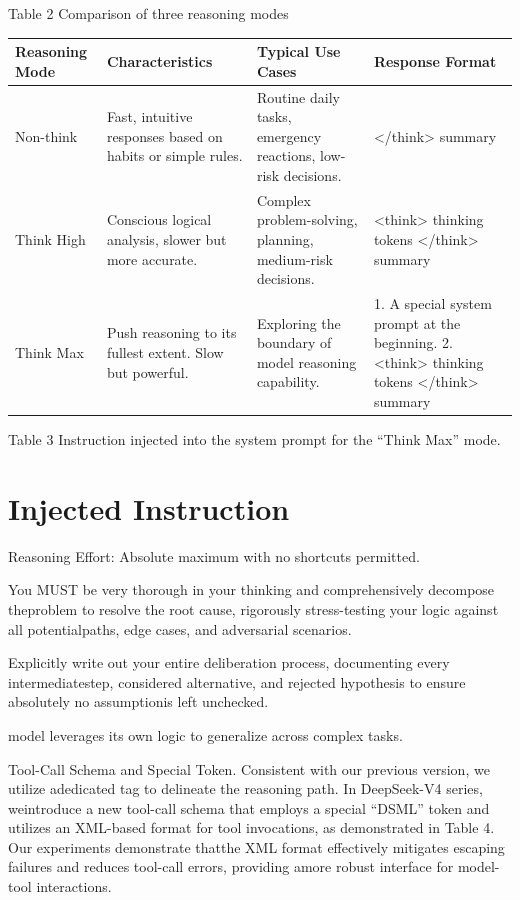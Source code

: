 \documentclass[
  10
]{article}
\newcounter{none} %
\begin{document}
Table 2 \textbar{} Comparison of three reasoning modes

{\def\LTcaptype{none} %
\begin{longtable}[]{@{}|l|l|l|l|@{}}
\toprule\noalign{}
\endhead
\bottomrule\noalign{}
\endlastfoot
\hline
Reasoning Mode & Characteristics & Typical Use Cases & Response
Format \\
\hline
Non-think & Fast, intuitive responses based on habits or simple rules. &
Routine daily tasks, emergency reactions, low-risk decisions. &
\textless/think\textgreater{} summary \\
\hline
Think High & Conscious logical analysis, slower but more accurate. &
Complex problem-solving, planning, medium-risk decisions. &
\textless think\textgreater{} thinking tokens
\textless/think\textgreater{} summary \\
\hline
Think Max & Push reasoning to its fullest extent. Slow but powerful. &
Exploring the boundary of model reasoning capability. & 1. A special
system prompt at the beginning. 2. \textless think\textgreater{}
thinking tokens \textless/think\textgreater{} summary \\
\hline
\end{longtable}
}

Table 3 \textbar{} Instruction injected into the system prompt for the
``Think Max'' mode.

\section{Injected Instruction}\label{injected-instruction}

Reasoning Effort: Absolute maximum with no shortcuts permitted.

You MUST be very thorough in your thinking and comprehensively decompose
theproblem to resolve the root cause, rigorously stress-testing your
logic against all potentialpaths, edge cases, and adversarial scenarios.

Explicitly write out your entire deliberation process, documenting every
intermediatestep, considered alternative, and rejected hypothesis to
ensure absolutely no assumptionis left unchecked.

model leverages its own logic to generalize across complex tasks.

Tool-Call Schema and Special Token. Consistent with our previous
version, we utilize adedicated tag to delineate the reasoning path. In
DeepSeek-V4 series, weintroduce a new tool-call schema that employs a
special ``\textbar DSML\textbar{}'' token and utilizes an XML-based
format for tool invocations, as demonstrated in Table 4. Our experiments
demonstrate thatthe XML format effectively mitigates escaping failures
and reduces tool-call errors, providing amore robust interface for
model-tool interactions.
\end{document}
